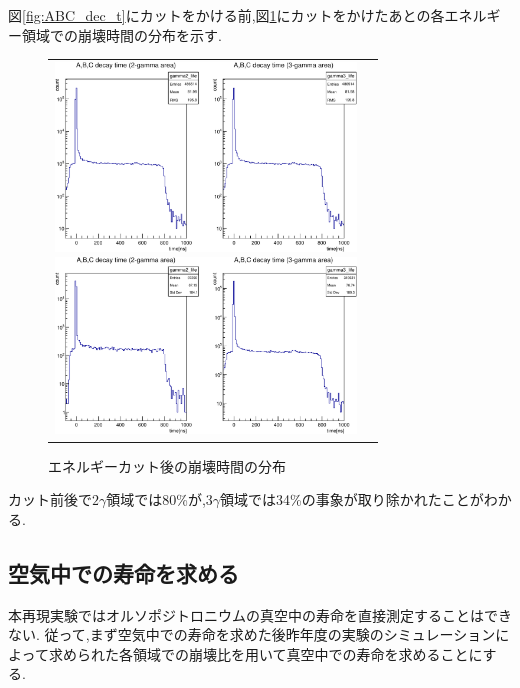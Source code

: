 図\ref{fig:ABC_dec_t}にカットをかける前,図\ref{fig:ABC_dec_t_cut}にカットをかけたあとの各エネルギー領域での崩壊時間の分布を示す.
\begin{figure}[H]
	\begin{tabular}{cc}
		\begin{minipage}{0.5\hsize}
			\begin{center}
				\includegraphics[width=80mm]{fig/isb/abc_dec_t_E.pdf}
				\caption{エネルギーカット前の崩壊時間の分布}
				\label{fig:ABC_dec_t}
			\end{center}
		\end{minipage}
		\begin{minipage}{0.5\hsize}
			\begin{center}
				\includegraphics[width=80mm]{fig/isb/abc_dec_t_E_cut.pdf}
				\caption{エネルギーカット後の崩壊時間の分布}
				\label{fig:ABC_dec_t_cut}
			\end{center}
		\end{minipage}
	\end{tabular}
\end{figure}
カット前後で$2\gamma$領域では80\%が,$3\gamma$領域では34\%の事象が取り除かれたことがわかる.


\subsection{空気中での寿命を求める}
本再現実験ではオルソポジトロニウムの真空中の寿命を直接測定することはできない.
従って,まず空気中での寿命を求めた後昨年度の実験のシミュレーションによって求められた各領域での崩壊比を用いて真空中での寿命を求めることにする.

